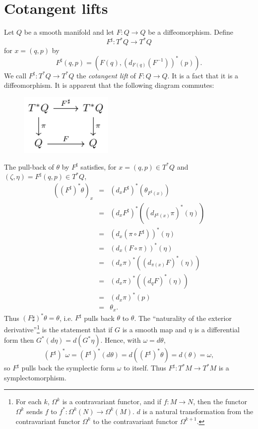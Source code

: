 \documentclass{article}
\begin{document}
\section{Cotangent lifts}
Let $Q$ be a smooth manifold and let $F:Q \to Q$ be a diffeomorphism. Define
\[
F^\sharp:T^*Q \to T^*Q
\]
for $x=(q,p)$ by
\[
F^\sharp(q,p)=(F(q),(d_{F(q)} (F^{-1}))^*(p)).
\]
We call $F^\sharp:T^*Q \to T^*Q$ the {\em cotangent lift} of $F:Q \to Q$. It is a fact that it is a diffeomorphism. It is apparent that the following diagram commutes:

\begin{figure}
\begin{center}
\includegraphics[width=0.4\textwidth]{tikz}
\end{center}
\end{figure}


The pull-back of $\theta$ by $F^\sharp$ satisfies, for $x=(q,p) \in T^*Q$ and $(\zeta,\eta)=F^\sharp(q,p) \in T^*Q$,
\begin{eqnarray*}
((F^\sharp)^* \theta)_x&=&(d_x F^\sharp)^*(\theta_{F^\sharp(x)})\\
&=&(d_x F^\sharp)^* ((d_{F^\sharp(x)} \pi)^*(\eta))\\
&=&(d_x (\pi \circ F^\sharp))^*(\eta)\\
&=&(d_x (F \circ \pi))^* (\eta)\\
&=&(d_x \pi)^* ( (d_{\pi(x)} F)^*(\eta)    )\\
&=&(d_x \pi)^* ( (d_q F)^*(\eta))\\
&=&(d_x \pi)^* (p)\\
&=&\theta_x.
\end{eqnarray*}
Thus $(F\sharp)^*\theta = \theta$, i.e. $F^\sharp$ pulls back $\theta$ to $\theta$. The ``naturality of the exterior derivative''\footnote{For each $k$, $\Omega^k$ is a contravariant functor, and  if $f:M \to N$, then the functor $\Omega^k$ sends $f$ to $f^*:\Omega^k(N) \to \Omega^k(M)$.
$d$ is a natural transformation from the contravariant functor $\Omega^k$ to the contravariant functor $\Omega^{k+1}$.} is the statement
that if $G$ is a smooth map and $\eta$ is a differential form then $G^*(d\eta)=d(G^*\eta)$. Hence, with $\omega=d\theta$,
\[
(F^\sharp)^* \omega = (F^\sharp)^* (d\theta)=d((F^\sharp)^* \theta)=d(\theta)=\omega,
\]
so $F^\sharp$ pulls back the symplectic form $\omega$  to  itself. Thus $F^\sharp:T^*M \to T^*M$ is a symplectomorphism.
\end{document}
